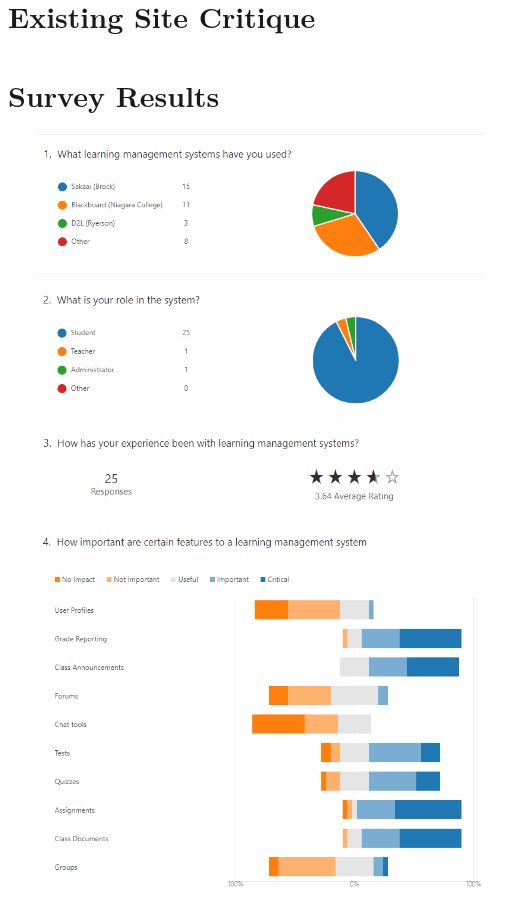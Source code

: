 \documentclass[12pt]{article}
\begin{document}
    \section{Existing Site Critique}\label{sec:existing-site-critique}



    \section{Survey Results}\label{sec:survey-results}

    \includegraphics[width=\textwidth]{survey/1.png}
    \includegraphics[width=\textwidth]{survey/2.png}
    \includegraphics[width=\textwidth]{survey/3.png}
    \includegraphics[width=\textwidth]{survey/4.png}
\end{document}
